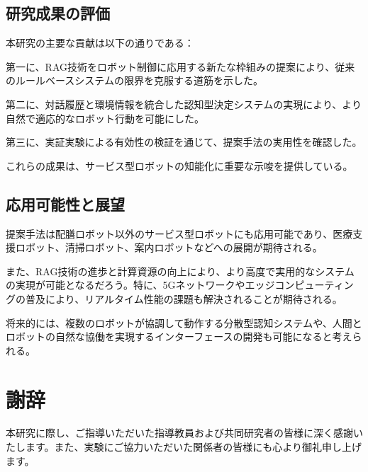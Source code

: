 \documentclass[12pt]{report}
\begin{document}
\section{研究成果の評価}
\label{sec:evaluation}

本研究の主要な貢献は以下の通りである：

第一に、RAG技術をロボット制御に応用する新たな枠組みの提案により、従来のルールベースシステムの限界を克服する道筋を示した。

第二に、対話履歴と環境情報を統合した認知型決定システムの実現により、より自然で適応的なロボット行動を可能にした。

第三に、実証実験による有効性の検証を通じて、提案手法の実用性を確認した。

これらの成果は、サービス型ロボットの知能化に重要な示唆を提供している。

\section{応用可能性と展望}
\label{sec:prospects}

提案手法は配膳ロボット以外のサービス型ロボットにも応用可能であり、医療支援ロボット、清掃ロボット、案内ロボットなどへの展開が期待される。

また、RAG技術の進歩と計算資源の向上により、より高度で実用的なシステムの実現が可能となるだろう。特に、5Gネットワークやエッジコンピューティングの普及により、リアルタイム性能の課題も解決されることが期待される。

将来的には、複数のロボットが協調して動作する分散型認知システムや、人間とロボットの自然な協働を実現するインターフェースの開発も可能になると考えられる。

\chapter*{謝辞}

本研究に際し、ご指導いただいた指導教員および共同研究者の皆様に深く感謝いたします。また、実験にご協力いただいた関係者の皆様にも心より御礼申し上げます。
\end{document}
